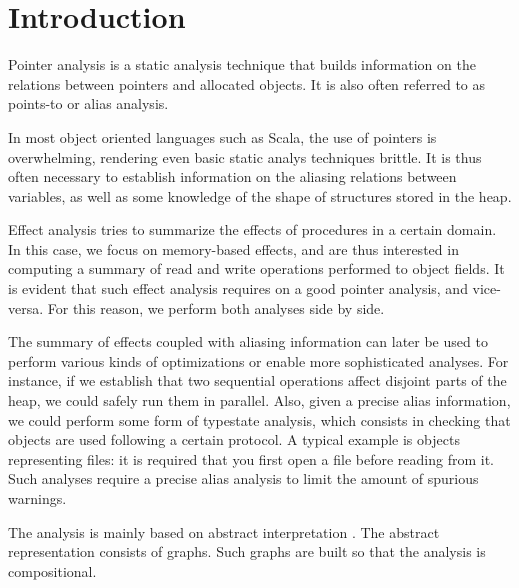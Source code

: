 \chapter{Introduction} \label{chap:intro}
Pointer analysis is a static analysis technique that builds information on the
relations between pointers and allocated objects. It is also often referred to
as points-to or alias analysis.

In most object oriented languages such as Scala, the use of pointers is
overwhelming, rendering even basic static analys techniques brittle. It is thus
often necessary to establish information on the aliasing relations between
variables, as well as some knowledge of the shape of structures stored in the
heap.

Effect analysis tries to summarize the effects of procedures in a certain
domain. In this case, we focus on memory-based effects, and are thus interested
in computing a summary of read and write operations performed to object fields.
It is evident that such effect analysis requires on a good pointer analysis,
and vice-versa. For this reason, we perform both analyses side by side.

The summary of effects coupled with aliasing information can later be used to
perform various kinds of optimizations or enable more sophisticated analyses.
For instance, if we establish that two sequential operations affect disjoint
parts of the heap, we could safely run them in parallel. Also, given a precise
alias information, we could perform some form of typestate analysis, which
consists in checking that objects are used following a certain protocol. A
typical example is objects representing files: it is required that you first
open a file before reading from it. Such analyses require a precise alias
analysis to limit the amount of spurious warnings.

The analysis is mainly based on abstract interpretation
\cite{DBLP:conf/popl/CousotC77,DBLP:conf/popl/CousotC02}. The abstract
representation consists of graphs. Such graphs are built so that the analysis
is compositional.

